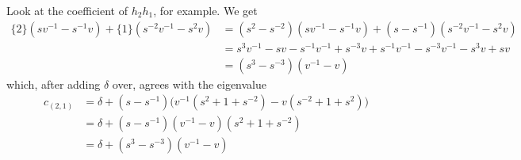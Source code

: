 Look at the coefficient of $h_2 h_1$, for example. We get
\begin{align*}
\{ 2 \} (s v^{-1} - s^{-1} v ) + \{ 1 \} ( s^{-2} v^{-1} - s^2 v ) &= ( s^2 - s^{-2} ) ( s v^{-1} - s^{-1} v ) + ( s - s^{-1} ) ( s^{-2} v^{-1} - s^2 v ) \\
&= s^3 v^{-1} - s v - s^{-1} v^{-1} + s^{-3} v + s^{-1} v^{-1} - s^{-3} v^{-1} - s^3 v + s v \\
&= ( s^3 - s^{-3} ) ( v^{-1} - v )
\end{align*}
which, after adding $\delta$ over, agrees with the eigenvalue 
\begin{align*}
c_{(2, 1)} &= \delta + ( s - s^{-1} ) \big( v^{-1} ( s^2 + 1 + s^{-2} ) - v ( s^{-2} + 1 + s^2 ) \big) \\
&= \delta + ( s - s^{-1} ) ( v^{-1} - v ) ( s^2 + 1 + s^{-2} ) \\
&= \delta + ( s^3 - s^{-3} ) ( v^{-1} - v )
\end{align*}
